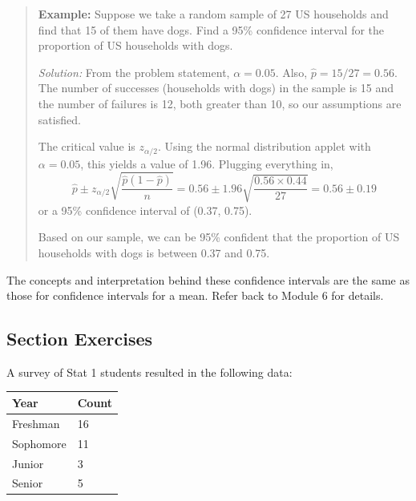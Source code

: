 \documentclass[
]{book}
\begin{document}
\begin{quote}
\textbf{Example:} Suppose we take a random sample of 27 US households and find that 15 of them have dogs. Find a 95\% confidence interval for the proportion of US households with dogs.

\emph{Solution:} From the problem statement, \(\alpha = 0.05\). Also, \(\hat{p} = 15/27 = 0.56\). The number of successes (households with dogs) in the sample is 15 and the number of failures is 12, both greater than 10, so our assumptions are satisfied.

The critical value is \(z_{\alpha/2}\). Using the normal distribution applet with \(\alpha = 0.05\), this yields a value of 1.96. Plugging everything in, \[\hat{p}\pm z_{\alpha/2}\sqrt{\frac{\hat{p}(1-\hat{p})}{n}} = 0.56 \pm 1.96\sqrt{\frac{0.56\times0.44}{27}} = 0.56 \pm 0.19\] or a 95\% confidence interval of (0.37, 0.75).

Based on our sample, we can be 95\% confident that the proportion of US households with dogs is between 0.37 and 0.75.
\end{quote}

The concepts and interpretation behind these confidence intervals are the same as those for confidence intervals for a mean. Refer back to Module 6 for details.

\subsection*{Section Exercises}\label{section-exercises-25}

A survey of Stat 1 students resulted in the following data:

\begin{longtable}[]{@{}ll@{}}
\toprule\noalign{}
Year & Count \\
\midrule\noalign{}
\endhead
\bottomrule\noalign{}
\endlastfoot
Freshman & 16 \\
Sophomore & 11 \\
Junior & 3 \\
Senior & 5 \\
\end{longtable}
\end{document}
